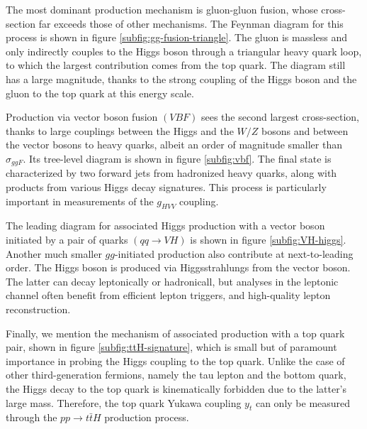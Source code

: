 The most dominant production mechanism is gluon-gluon fusion, whose cross-section far exceeds those of other mechanisms. 
The Feynman diagram for this process is shown in figure \ref{subfig:gg-fusion-triangle}. 
The gluon is massless and only indirectly couples to the Higgs boson through a triangular heavy quark loop, to which the largest contribution comes from the top quark. 
The diagram still has a large magnitude, thanks to the strong coupling of the Higgs boson and the gluon to the top quark at this energy scale. 

Production via vector boson fusion $(VBF)$ sees the second largest cross-section, thanks to large couplings between the Higgs and the $W/Z$ bosons and between the vector bosons to heavy quarks, albeit an order of magnitude smaller than $\sigma_{ggF}$. 
Its tree-level diagram is shown in figure \ref{subfig:vbf}. 
The final state is characterized by two forward jets from hadronized heavy quarks, along with products from various Higgs decay signatures. 
This process is particularly important in measurements of the $g_{HVV}$ coupling.

The leading diagram for associated Higgs production with a vector boson initiated by a pair of quarks $(qq\rightarrow VH)$ is shown in figure \ref{subfig:VH-higgs}. 
Another much smaller $gg$-initiated production also contribute at next-to-leading order. 
The Higgs boson is produced via Higgsstrahlungs from the vector boson. 
The latter can decay leptonically or hadronicall, but analyses in the leptonic channel often benefit from efficient lepton triggers, and high-quality lepton reconstruction. 

Finally, we mention the mechanism of associated production with a top quark pair, shown in figure \ref{subfig:ttH-signature}, which is small but of paramount importance in probing the Higgs coupling to the top quark. 
Unlike the case of other third-generation fermions, namely the tau lepton and the bottom quark, the Higgs decay to the top quark is kinematically forbidden due to the latter's large mass. 
Therefore, the top quark Yukawa coupling $y_t$ can only be measured through the $pp\rightarrow t\bar{t}H$ production process. 

